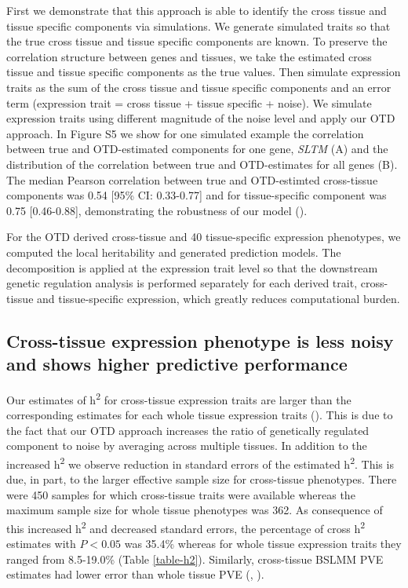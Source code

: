 \documentclass[10pt,letterpaper]{article}
\begin{document}
First we demonstrate that this approach is able to identify the cross tissue and tissue specific components via simulations. We generate simulated traits so that the true cross tissue and tissue specific components are known. To preserve the correlation structure between genes and tissues, we take the estimated cross tissue and tissue specific components as the true values. Then simulate expression traits as the sum of the cross tissue and tissue specific components and an error term (expression trait = cross tissue + tissue specific + noise). We simulate expression traits using different magnitude of the noise level and apply our OTD approach. 
In Figure S5 we show for one simulated example the correlation between true and OTD-estimated components for one gene, \textit{SLTM} (A) and the distribution of the correlation between true and OTD-estimates for all genes (B). The median Pearson correlation between true and OTD-estimted cross-tissue components was 0.54 [95\% CI: 0.33-0.77] and for tissue-specific component was 0.75 [0.46-0.88], demonstrating the robustness of our model (). 

For the OTD derived cross-tissue and 40 tissue-specific expression phenotypes, we computed the local heritability and generated prediction models.
The decomposition is applied at the expression trait level so that the downstream genetic regulation analysis is performed separately for each derived trait, cross-tissue and tissue-specific expression, which greatly reduces computational burden. 

\subsection*{Cross-tissue expression phenotype is less noisy and shows higher predictive performance}%

Our estimates of h\textsuperscript{2} for cross-tissue expression traits are larger than the corresponding estimates for each whole tissue expression traits ().
This is due to the fact that our OTD approach increases the ratio of genetically regulated component to noise by averaging across multiple tissues. In addition to the increased h\textsuperscript{2} we observe reduction in standard errors of the estimated h\textsuperscript{2}. This is due, in part, to the larger effective sample size for cross-tissue phenotypes. There were 450 samples for which cross-tissue traits were available whereas the maximum sample size for whole tissue phenotypes was 362. As consequence of this increased h\textsuperscript{2} and decreased standard errors, the percentage of cross h\textsuperscript{2} estimates with $P < 0.05$ was 35.4\% whereas for whole tissue expression traits they ranged from 8.5-19.0\% (Table \ref{table-h2}). Similarly, cross-tissue BSLMM PVE estimates had lower error than whole tissue PVE (, ). 
\end{document}
